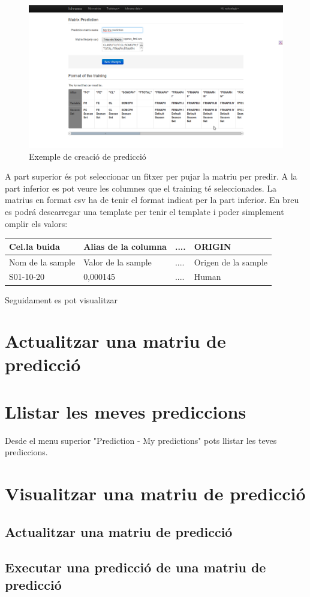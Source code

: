 \begin{figure}[h!]
  \centering
  \includegraphics[scale=0.2]{img/userguide/prediction_create.png}
  \caption{Exemple de creaci\'{o} de predicci\'{o}}
  \label{fig:placement}
\end{figure}

A part superior \'{e}s pot seleccionar un fitxer per pujar la matriu per predir. A la part inferior es pot veure les columnes que el training t\'{e} seleccionades. La matrius en format csv ha de tenir el format indicat per la part inferior. En breu es podr\'{a} descarregar una template per tenir el template i poder simplement omplir els valors:
\begin{center}
    \begin{tabular}{ | l | l | l | p{5cm} |}
    \hline
    Cel.la buida & Alias de la columna & .... & ORIGIN \\ \hline
    Nom de la sample & Valor de la sample  & .... & Origen de la sample \\ \hline
    S01-10-20        & 0,000145            & .... & Human \\ \hline
    \hline
    \end{tabular}
\end{center}
Seguidament es pot visualitzar

\section{Actualitzar una matriu de predicci\'{o}}

\section{Llistar les meves prediccions}
Desde el menu superior "Prediction - My predictions" pots llistar les teves prediccions.

\section{Visualitzar una matriu de predicci\'{o}}

\subsection{Actualitzar una matriu de predicci\'{o}}

\subsection{Executar una predicci\'{o} de una matriu de predicci\'{o}}


